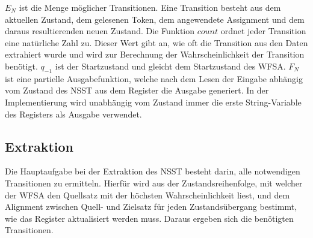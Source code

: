 \documentclass[conference]{IEEEtran}
\begin{document}
$E_N$ ist die Menge möglicher Transitionen.
Eine Transition besteht aus dem aktuellen Zustand, dem gelesenen Token, dem angewendete Assignment und dem daraus resultierenden neuen Zustand.
Die Funktion $count$ ordnet jeder Transition eine natürliche Zahl zu.
Dieser Wert gibt an, wie oft die Transition aus den Daten extrahiert wurde und wird zur Berechnung der Wahrscheinlichkeit der Transition benötigt.
$q_{-1}$ ist der Startzustand und gleicht dem Startzustand des WFSA.
$F_N$ ist eine partielle Ausgabefunktion, welche nach dem Lesen der Eingabe abhängig vom Zustand des NSST aus dem Register die Ausgabe generiert.
In der Implementierung wird unabhängig vom Zustand immer die erste String-Variable des Registers als Ausgabe verwendet.


\subsection{Extraktion}
Die Hauptaufgabe bei der Extraktion des NSST besteht darin, alle notwendigen Transitionen zu ermitteln.
Hierfür wird aus der Zustandsreihenfolge, mit welcher der WFSA den Quellsatz mit der höchsten Wahrscheinlichkeit liest, 
und dem Alignment zwischen Quell- und Zielsatz für jeden Zustandsübergang bestimmt, wie das Register aktualisiert werden muss.
Daraus ergeben sich die benötigten Transitionen.
\end{document}
